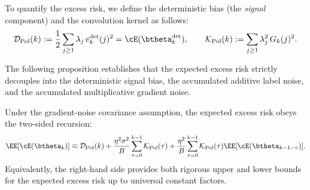 To quantify the excess risk, we define the deterministic bias (the \textit{signal} component) and the convolution kernel as follows:
\[
    \mathcal D_{\mathrm{Pol}}(k) := \frac{1}{2}\sum_{j\ge1}\lambda_j\,e_k^{\mathrm{det}}(j)^2 = \cE(\btheta_k^{\mathrm{det}}),
    \qquad
    \mathcal K_{\mathrm{Pol}}(k) := \sum_{j\ge1}\lambda_j^2\,G_k(j)^2.
\]

The following proposition establishes that the expected excess risk strictly decouples into the deterministic signal bias, the accumulated additive label noise, and the accumulated multiplicative gradient noise.

\begin{proposition}
\label{prop:pol_risk_recursion}
Under the gradient-noise covariance assumption, the expected excess risk obeys the two-sided recursion:
\begin{equation} \label{eq:pol_risk_recursion_form}
    \EE[\cE(\btheta_k)]
    \eqsim
    \mathcal{D}_{\mathrm{Pol}}(k)
    +
    \frac{\eta^2\sigma^2}{B}\sum_{\tau=0}^{k-1}\mathcal{K}_{\mathrm{Pol}}(\tau)
    +
    \frac{\eta^2}{B}\sum_{\tau=0}^{k-1}\mathcal{K}_{\mathrm{Pol}}(\tau)\EE[\cE(\btheta_{k-1-\tau})].
\end{equation}
Equivalently, the right-hand side provides both rigorous upper and lower bounds for the expected excess risk up to universal constant factors.
\end{proposition}

